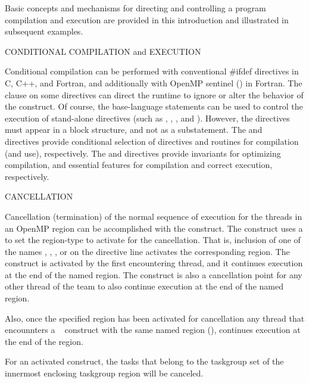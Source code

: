 \label{chap:program_control}

Basic concepts and mechanisms for directing and controlling a program compilation and execution
are provided in this introduction and illustrated in subsequent examples.

\bigskip
CONDITIONAL COMPILATION and EXECUTION

Conditional compilation can be performed with conventional \#ifdef directives
in C, C++, and Fortran, and additionally with OpenMP sentinel (\code{!\$}) in Fortran. 
The  clause on some directives
can direct the runtime to ignore or alter the behavior of the construct.
Of course, the base-language  statements can be used to control the execution
of stand-alone directives (such as , , , 
and  ).
However, the directives must appear in a block structure, and not as a substatement.
The  and ~ directives provide conditional 
selection of directives and routines for compilation (and use), respectively.
The  and  directives provide invariants
for optimizing compilation, and essential features for compilation 
and correct execution, respectively.


\bigskip
CANCELLATION

Cancellation (termination) of the normal sequence of execution for the threads in an OpenMP region can
be  accomplished with the  construct.  The construct uses a
 to set the region-type to activate for the cancellation. 
That is, inclusion  of one of the  names , , 
,  or  on the directive line 
activates the corresponding region.  
The  construct is activated by the first encountering thread,  and it
continues execution at the end of the named region.
The  construct is also a cancellation point for any other thread of the team 
to also continue execution at the end of the named region.  

Also, once the specified region has been activated for cancellation any thread that encounnters 
a ~ construct with the same named region (),
continues execution at the end of the region.

For an activated  construct, the tasks that
belong to the taskgroup set of the innermost enclosing taskgroup region will be canceled. 

